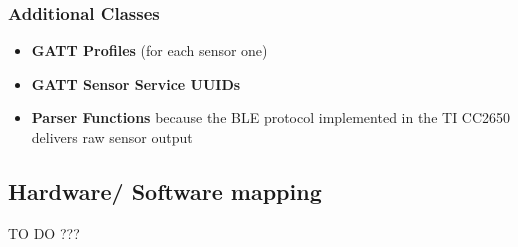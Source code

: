 \subsubsection{Additional Classes}
\begin{itemize}
  \item \textbf{GATT Profiles} (for each sensor one)
  \item \textbf{GATT Sensor Service UUIDs}
  \item \textbf{Parser Functions} because the BLE protocol implemented in the TI CC2650 delivers raw sensor output
\end{itemize}

\subsection{Hardware/ Software mapping}

TO DO ???